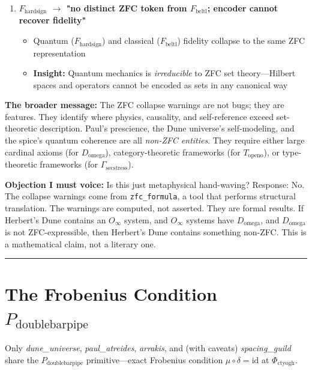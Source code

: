 \documentclass[12pt,a4paper]{article}
\begin{document}
\begin{enumerate}
    \item 
    \textbf{$F_{\text{hardsign}}$ $\rightarrow$ "no distinct ZFC token from $F_{\text{beltl}}$; encoder cannot recover fidelity"}

    \begin{itemize}
    \item Quantum ($F_{\text{hardsign}}$) and classical ($F_{\text{beltl}}$) fidelity collapse to the same ZFC representation
    \item \textbf{Insight:} Quantum mechanics is \emph{irreducible} to ZFC set theory---Hilbert spaces and operators cannot be encoded as sets in any canonical way
\end{itemize}

\end{enumerate}

\textbf{The broader message:} The ZFC collapse warnings are not bugs; they are features. They identify where physics, causality, and self-reference exceed set-theoretic description. Paul's prescience, the Dune universe's self-modeling, and the spice's quantum coherence are all \emph{non-ZFC entities}. They require either large cardinal axioms (for $D_{\text{omega}}$), category-theoretic frameworks (for $T_{\text{openo}}$), or type-theoretic frameworks (for $\Gamma_{\text{secstress}}$).

\textbf{Objection I must voice:} Is this just metaphysical hand-waving? Response: No. The collapse warnings come from \texttt{zfc\_formula}, a tool that performs structural translation. The warnings are computed, not asserted. They are formal results. If Herbert's Dune contains an $O_{\infty}$ system, and $O_{\infty}$ systems have $D_{\text{omega}}$, and $D_{\text{omega}}$ is not ZFC-expressible, then Herbert's Dune contains something non-ZFC. This is a mathematical claim, not a literary one.

\begin{center}
\rule{0.5\textwidth}{0.4pt}
\end{center}

\section{The Frobenius Condition $P_{\text{doublebarpipe}}$}

Only \emph{dune\_universe}, \emph{paul\_atreides}, \emph{arrakis}, and (with caveats) \emph{spacing\_guild} share the $P_{\text{doublebarpipe}}$ primitive---exact Frobenius condition $\mu \circ \delta = \text{id}$ at $\Phi_{\text{ctyogh}}$.
\end{document}
